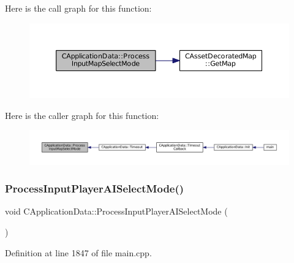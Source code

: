 Here is the call graph for this function\+:
\nopagebreak
\begin{figure}[H]
\begin{center}
\leavevmode
\includegraphics[width=350pt]{classCApplicationData_a4fb3ad6900161476b5dace2d7cf9908c_cgraph}
\end{center}
\end{figure}
Here is the caller graph for this function\+:
\nopagebreak
\begin{figure}[H]
\begin{center}
\leavevmode
\includegraphics[width=350pt]{classCApplicationData_a4fb3ad6900161476b5dace2d7cf9908c_icgraph}
\end{center}
\end{figure}
\hypertarget{classCApplicationData_a096afda0b6459cfa73d66518ce23f68e}{}\label{classCApplicationData_a096afda0b6459cfa73d66518ce23f68e} 
\subsubsection{\texorpdfstring{Process\+Input\+Player\+A\+I\+Select\+Mode()}{ProcessInputPlayerAISelectMode()}}
{\footnotesize\ttfamily void C\+Application\+Data\+::\+Process\+Input\+Player\+A\+I\+Select\+Mode (\begin{DoxyParamCaption}{ }\end{DoxyParamCaption})\hspace{0.3cm}{\ttfamily [protected]}}



Definition at line 1847 of file main.\+cpp.


